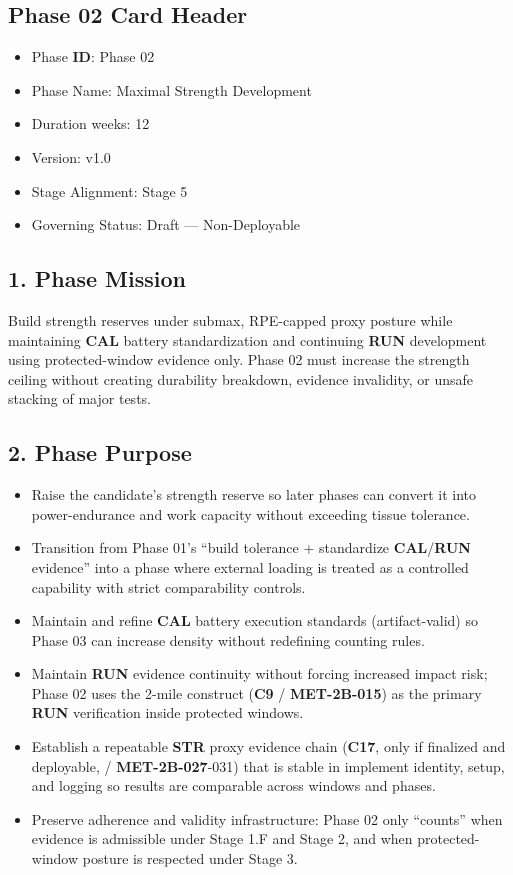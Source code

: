 \documentclass[10pt]{article}
\begin{document}
\subsection*{Phase 02 Card Header}
{}

\begin{itemize}
\item Phase \textbf{ID}: Phase 02
\item Phase Name: Maximal Strength Development
\item Duration weeks: 12
\item Version: v1.0
\item Stage Alignment: Stage 5
\item Governing Status: Draft — Non-Deployable
\end{itemize}

\subsection*{1. Phase Mission}

Build strength reserves under submax, RPE-capped proxy posture while maintaining \textbf{CAL} battery standardization and continuing \textbf{RUN} development using protected-window evidence only. Phase 02 must increase the strength ceiling without creating durability breakdown, evidence invalidity, or unsafe stacking of major tests.

\subsection*{2. Phase Purpose}

\begin{itemize}
\item Raise the candidate’s strength reserve so later phases can convert it into power-endurance and work capacity without exceeding tissue tolerance.
\item Transition from Phase 01’s “build tolerance + standardize \textbf{CAL}/\textbf{RUN} evidence” into a phase where external loading is treated as a controlled capability with strict comparability controls.
\item Maintain and refine \textbf{CAL} battery execution standards (artifact-valid) so Phase 03 can increase density without redefining counting rules.
\item Maintain \textbf{RUN} evidence continuity without forcing increased impact risk; Phase 02 uses the 2-mile construct (\textbf{C9} / \textbf{MET-2B-015}) as the primary \textbf{RUN} verification inside protected windows.
\item Establish a repeatable \textbf{STR} proxy evidence chain (\textbf{C17}, only if finalized and deployable, / \textbf{MET-2B-027}-031) that is stable in implement identity, setup, and logging so results are comparable across windows and phases.
\item Preserve adherence and validity infrastructure: Phase 02 only “counts” when evidence is admissible under Stage 1.F and Stage 2, and when protected-window posture is respected under Stage 3.
\end{itemize}
\end{document}
